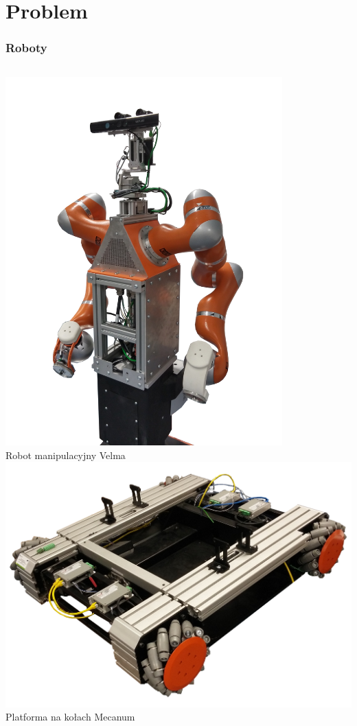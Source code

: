 \documentclass{beamer}
\begin{document}
	\section{Problem}
	\begin{frame}
		\frametitle{Roboty}
		\begin{columns}[c]
			\centering
			\includegraphics[width=0.8\textwidth]{graphics/velma.png} \\
			Robot manipulacyjny Velma
			\centering
			\includegraphics[width=\textwidth]{graphics/omnivelma.png} \\
			Platforma na kołach Mecanum
		\end{columns}
	\end{frame}
	
\end{document}
